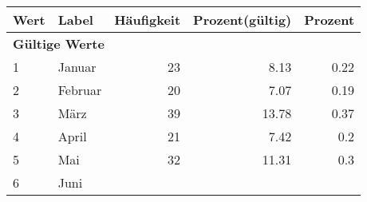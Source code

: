      \begin{longtable}{lXrrr}
     \toprule
     \textbf{Wert} & \textbf{Label} & \textbf{Häufigkeit} & \textbf{Prozent(gültig)} & \textbf{Prozent} \\
     \endhead
     \midrule
     \multicolumn{5}{l}{\textbf{Gültige Werte}}\\

     1 &
     \multicolumn{1}{X}{ Januar   } &


       \num{23} &
       \num[round-mode=places,round-precision=2]{8.13} &
         \num[round-mode=places,round-precision=2]{0.22} \\

     2 &
     \multicolumn{1}{X}{ Februar   } &


       \num{20} &
       \num[round-mode=places,round-precision=2]{7.07} &
         \num[round-mode=places,round-precision=2]{0.19} \\

     3 &
     \multicolumn{1}{X}{ März   } &


       \num{39} &
       \num[round-mode=places,round-precision=2]{13.78} &
         \num[round-mode=places,round-precision=2]{0.37} \\

     4 &
     \multicolumn{1}{X}{ April   } &


       \num{21} &
       \num[round-mode=places,round-precision=2]{7.42} &
         \num[round-mode=places,round-precision=2]{0.2} \\

     5 &
     \multicolumn{1}{X}{ Mai   } &


       \num{32} &
       \num[round-mode=places,round-precision=2]{11.31} &
         \num[round-mode=places,round-precision=2]{0.3} \\

     6 &
     \multicolumn{1}{X}{ Juni   } &



\end{longtable}

